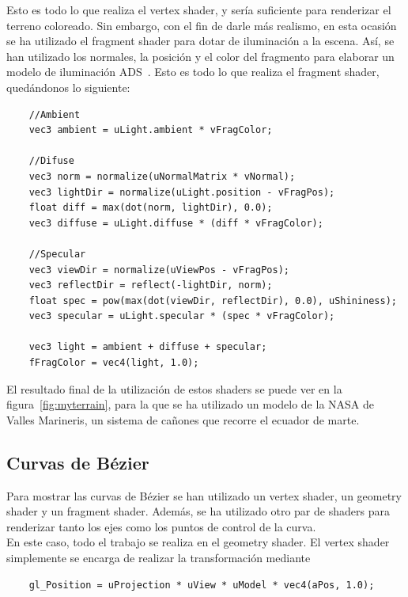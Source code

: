 Esto es todo lo que realiza el vertex shader, y sería suficiente para renderizar
el terreno coloreado. Sin embargo, con el fin de darle más realismo, en esta
ocasión se ha utilizado el fragment shader para dotar de iluminación a la
escena. Así, se han utilizado los normales, la posición y el color del fragmento
para elaborar un modelo de iluminación ADS~\cite{Bailey}. Esto es todo lo que
realiza el fragment shader, quedándonos lo siguiente:

\begin{verbatim}
    //Ambient
    vec3 ambient = uLight.ambient * vFragColor; 
    
    //Difuse
    vec3 norm = normalize(uNormalMatrix * vNormal);
    vec3 lightDir = normalize(uLight.position - vFragPos);
    float diff = max(dot(norm, lightDir), 0.0);
    vec3 diffuse = uLight.diffuse * (diff * vFragColor); 
    
    //Specular
    vec3 viewDir = normalize(uViewPos - vFragPos);
    vec3 reflectDir = reflect(-lightDir, norm); 
    float spec = pow(max(dot(viewDir, reflectDir), 0.0), uShininess);
    vec3 specular = uLight.specular * (spec * vFragColor);
    
    vec3 light = ambient + diffuse + specular;
    fFragColor = vec4(light, 1.0);
\end{verbatim}

El resultado final de la utilización de estos shaders se puede ver en la
figura~\ref{fig:myterrain}, para la que se ha utilizado un modelo de la NASA de
Valles Marineris, un sistema de cañones que recorre el ecuador de marte.

\subsection{Curvas de Bézier}
\label{makereference5.5.2}

Para mostrar las curvas de Bézier se han utilizado un vertex shader, un geometry
shader y un fragment shader. Además, se ha utilizado otro par de shaders para
renderizar tanto los ejes como los puntos de control de la curva. \\

En este caso, todo el trabajo se realiza en el geometry shader. El vertex shader
simplemente se encarga de realizar la transformación mediante

\begin{verbatim}
    gl_Position = uProjection * uView * uModel * vec4(aPos, 1.0);
\end{verbatim}


